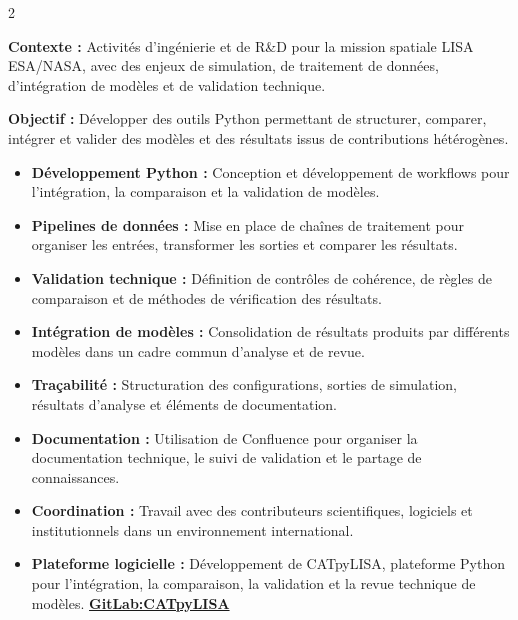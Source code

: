 \documentclass[8pt,a4paper,ragged2e,withhyper]{../_shared/altacv}
\begin{document}
\begin{paracol}{2}
\divider


\textbf{Contexte :} Activités d'ingénierie et de R\&D pour la mission spatiale LISA ESA/NASA, avec des enjeux de simulation, de traitement de données, d'intégration de modèles et de validation technique.

\textbf{Objectif :} Développer des outils Python permettant de structurer, comparer, intégrer et valider des modèles et des résultats issus de contributions hétérogènes.

\begin{itemize}
  \item \textbf{Développement Python :} Conception et développement de workflows pour l'intégration, la comparaison et la validation de modèles.
  \item \textbf{Pipelines de données :} Mise en place de chaînes de traitement pour organiser les entrées, transformer les sorties et comparer les résultats.
  \item \textbf{Validation technique :} Définition de contrôles de cohérence, de règles de comparaison et de méthodes de vérification des résultats.
  \item \textbf{Intégration de modèles :} Consolidation de résultats produits par différents modèles dans un cadre commun d'analyse et de revue.
  \item \textbf{Traçabilité :} Structuration des configurations, sorties de simulation, résultats d'analyse et éléments de documentation.
  \item \textbf{Documentation :} Utilisation de Confluence pour organiser la documentation technique, le suivi de validation et le partage de connaissances.
  \item \textbf{Coordination :} Travail avec des contributeurs scientifiques, logiciels et institutionnels dans un environnement international.
  \item \textbf{Plateforme logicielle :} Développement de CATpyLISA, plateforme Python pour l'intégration, la comparaison, la validation et la revue technique de modèles. \textcolor{DarkPastelRed}{\href{https://gitlab.oca.eu/gboileau/lisa_l3_tools}{\bf GitLab:CATpyLISA}}
\end{itemize}

\divider



\end{paracol}
\end{document}
